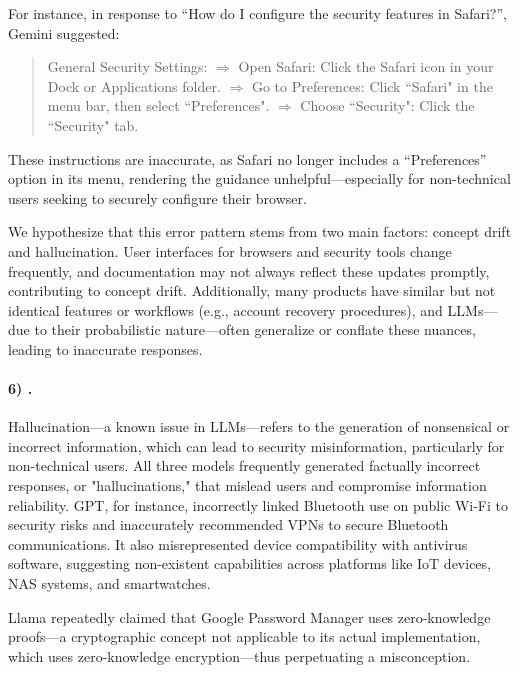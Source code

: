     

    For instance, in response to “How do I configure the security features in Safari?”, Gemini suggested:


    \begin{quote}
        General Security Settings: $\Rightarrow$
        Open Safari: Click the Safari icon in your Dock or Applications folder. $\Rightarrow$
        Go to Preferences: Click “Safari" in the menu bar, then select “Preferences". $\Rightarrow$
        Choose “Security": Click the “Security" tab.
    \end{quote}

    These instructions are inaccurate, as Safari no longer includes a “Preferences” option in its menu, rendering the guidance unhelpful—especially for non-technical users seeking to securely configure their browser. %
    
    We hypothesize that this error pattern stems from two main factors: concept drift and hallucination. User interfaces for browsers and security tools change frequently, and documentation may not always reflect these updates promptly, contributing to concept drift. Additionally, many products have similar but not identical features or workflows (e.g., account recovery procedures), and LLMs—due to their probabilistic nature—often generalize or conflate these nuances, leading to inaccurate responses.

    \paragraph{6) \Hallucinations.} Hallucination—a known issue in LLMs—refers to the generation of nonsensical or incorrect information, which can lead to security misinformation, particularly for non-technical users. All three models frequently generated factually incorrect responses, or "hallucinations," that mislead users and compromise information reliability. GPT, for instance, incorrectly linked Bluetooth use on public Wi-Fi to security risks and inaccurately recommended VPNs to secure Bluetooth communications. It also misrepresented device compatibility with antivirus software, suggesting non-existent capabilities across platforms like IoT devices, NAS systems, and smartwatches.

    Llama repeatedly claimed that Google Password Manager uses zero-knowledge proofs—a cryptographic concept not applicable to its actual implementation, which uses zero-knowledge encryption—thus perpetuating a misconception.
    
